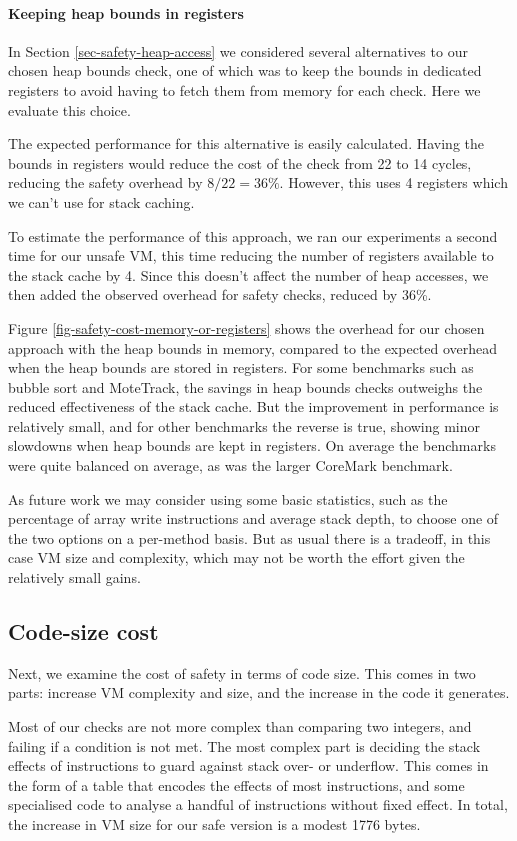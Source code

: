\paragraph{Keeping heap bounds in registers}
In Section \ref{sec-safety-heap-access} we considered several alternatives to our chosen heap bounds check, one of which was to keep the bounds in dedicated registers to avoid having to fetch them from memory for each check. Here we evaluate this choice.

The expected performance for this alternative is easily calculated. Having the bounds in registers would reduce the cost of the check from 22 to 14 cycles, reducing the safety overhead by $8/22=36\%$. However, this uses 4 registers which we can't use for stack caching.

To estimate the performance of this approach, we ran our experiments a second time for our unsafe VM, this time reducing the number of registers available to the stack cache by 4. Since this doesn't affect the number of heap accesses, we then added the observed overhead for safety checks, reduced by 36\%.

Figure \ref{fig-safety-cost-memory-or-registers} shows the overhead for our chosen approach with the heap bounds in memory, compared to the expected overhead when the heap bounds are stored in registers. For some benchmarks such as bubble sort and MoteTrack, the savings in heap bounds checks outweighs the reduced effectiveness of the stack cache. But the improvement in performance is relatively small, and for other benchmarks the reverse is true, showing minor slowdowns when heap bounds are kept in registers. On average the benchmarks were quite balanced on average, as was the larger CoreMark benchmark.

As future work we may consider using some basic statistics, such as the percentage of array write instructions and average stack depth, to choose one of the two options on a per-method basis. But as usual there is a tradeoff, in this case VM size and complexity, which may not be worth the effort given the relatively small gains.

\subsection{Code-size cost}
Next, we examine the cost of safety in terms of code size. This comes in two parts: increase VM complexity and size, and the increase in the code it generates.

Most of our checks are not more complex than comparing two integers, and failing if a condition is not met. The most complex part is deciding the stack effects of instructions to guard against stack over- or underflow. This comes in the form of a table that encodes the effects of most instructions, and some specialised code to analyse a handful of instructions without fixed effect. In total, the increase in VM size for our safe version is a modest 1776 bytes.

